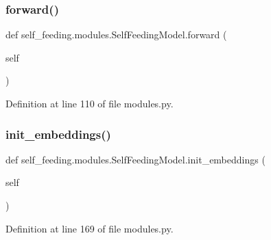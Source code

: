 \subsubsection{\texorpdfstring{forward()}{forward()}}
{\footnotesize\ttfamily def self\+\_\+feeding.\+modules.\+Self\+Feeding\+Model.\+forward (\begin{DoxyParamCaption}\item[{}]{self }\end{DoxyParamCaption})}



Definition at line 110 of file modules.\+py.

\mbox{\label{classself__feeding_1_1modules_1_1SelfFeedingModel_a7f8b99a9c823753ddf1d94d6660a7f6d}} 
\subsubsection{\texorpdfstring{init\+\_\+embeddings()}{init\_embeddings()}}
{\footnotesize\ttfamily def self\+\_\+feeding.\+modules.\+Self\+Feeding\+Model.\+init\+\_\+embeddings (\begin{DoxyParamCaption}\item[{}]{self }\end{DoxyParamCaption})}



Definition at line 169 of file modules.\+py.



